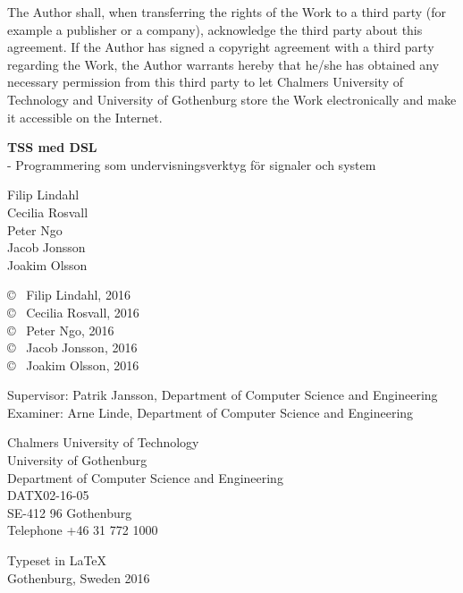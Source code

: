 The Author shall, when transferring the rights of the Work to a third
party (for example a publisher or a company), acknowledge the third
party about this agreement. If the Author has signed a copyright
agreement with a third party regarding the Work, the Author warrants
hereby that he/she has obtained any necessary permission from this
third party to let Chalmers University of Technology and University of
Gothenburg store the Work electronically and make it accessible on the
Internet.

\vspace{1.5cm}

\textbf{TSS med DSL} \\
- Programmering som undervisningsverktyg för signaler och system

\vspace{1cm}

Filip Lindahl   \\
Cecilia Rosvall \\
Peter Ngo       \\
Jacob Jonsson   \\
Joakim Olsson

\copyright ~ Filip Lindahl, 2016  \\
\copyright ~ Cecilia Rosvall, 2016\\
\copyright ~ Peter Ngo, 2016      \\
\copyright ~ Jacob Jonsson, 2016  \\
\copyright ~ Joakim Olsson, 2016
\vspace{0.5cm}

Supervisor: Patrik Jansson, Department of Computer Science and Engineering \\
Examiner: Arne Linde, Department of Computer Science and Engineering
\vspace{0.5cm}

Chalmers University of Technology\\
University of Gothenburg \\
Department of Computer Science and Engineering \\
DATX02-16-05 \\
SE-412 96 Gothenburg\\
Telephone +46 31 772 1000 \setlength{\parskip}{0.5cm}

\vfill
Typeset in \LaTeX \\
Gothenburg, Sweden 2016
